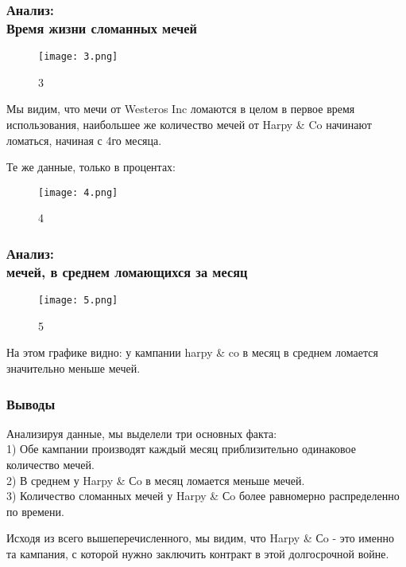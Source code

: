 \documentclass[8pt]{beamer}
\begin{document}
\begin{frame}
\frametitle{Анализ:\\ {\small Время жизни сломанных мечей}}
\begin{figure}[h]
		\texttt{[image: 3.png]}
		\caption{3}
		\label{Third}
\end{figure}
Мы видим, что мечи от Westeros Inc ломаются в целом в первое время использования, наибольшее же количество мечей от Harpy \& Co начинают ломаться, начиная с 4го месяца.
\end{frame}





\begin{frame}

Те же данные, только в процентах:
\begin{figure}[h]
		\texttt{[image: 4.png]}
		\caption{4}
		\label{Fourth}
\end{figure}
\end{frame}




\begin{frame}
\frametitle{Анализ:\\{ мечей, в среднем ломающихся за месяц}}
\begin{figure}[h]
		\texttt{[image: 5.png]}
		\caption{5}
		\label{Fifth}
\end{figure}
На этом графике видно: у кампании harpy \& co в месяц в среднем ломается значительно меньше мечей.\\
\end{frame}



\begin{frame}
\frametitle{Выводы}
Анализируя данные, мы выделели три основных факта:\\
1) Обе кампании производят каждый месяц приблизительно одинаковое количество мечей.\\
2) В среднем у Harpy \& Сo в месяц ломается меньше мечей.\\ 
3) Количество сломанных мечей у Harpy \& Сo более равномерно распределенно по времени.
\\

\bigskip

Исходя из всего вышеперечисленного, мы видим, что Harpy \& Сo - это именно та кампания, с которой нужно заключить контракт в этой долгосрочной войне. 

\end{frame}
\end{document}
